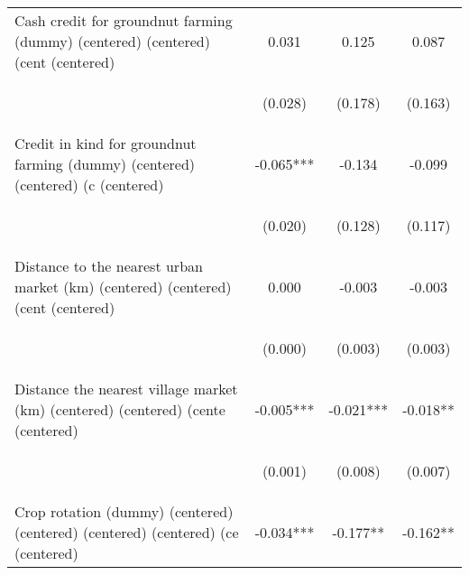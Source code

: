 \begin{center}
\begin{tabular}{lccc}
Cash credit for groundnut farming (dummy) (centered) (centered) (cent (centered) & 0.031 & 0.125 & 0.087 \\
\vspace{4pt} & \begin{footnotesize}(0.028)\end{footnotesize} & \begin{footnotesize}(0.178)\end{footnotesize} & \begin{footnotesize}(0.163)\end{footnotesize} \\
Credit in kind for groundnut farming (dummy) (centered) (centered) (c (centered) & -0.065*** & -0.134 & -0.099 \\
\vspace{4pt} & \begin{footnotesize}(0.020)\end{footnotesize} & \begin{footnotesize}(0.128)\end{footnotesize} & \begin{footnotesize}(0.117)\end{footnotesize} \\
Distance to the nearest urban market (km) (centered) (centered) (cent (centered) & 0.000 & -0.003 & -0.003 \\
\vspace{4pt} & \begin{footnotesize}(0.000)\end{footnotesize} & \begin{footnotesize}(0.003)\end{footnotesize} & \begin{footnotesize}(0.003)\end{footnotesize} \\
Distance the nearest village market (km) (centered) (centered) (cente (centered) & -0.005*** & -0.021*** & -0.018** \\
\vspace{4pt} & \begin{footnotesize}(0.001)\end{footnotesize} & \begin{footnotesize}(0.008)\end{footnotesize} & \begin{footnotesize}(0.007)\end{footnotesize} \\
Crop rotation (dummy) (centered) (centered) (centered) (centered) (ce (centered) & -0.034*** & -0.177** & -0.162** \\

\end{tabular}
\end{center}
